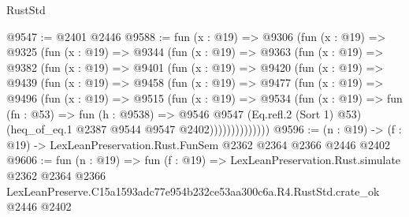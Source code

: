 \begin{lexlean}{RustStd}
\begin{coremodule}
@9547 := @2401 @2446
@9588 := fun (x : @19) =>
  @9306
    (fun (x : @19) =>
    @9325
      (fun (x : @19) =>
      @9344
        (fun (x : @19) =>
        @9363
          (fun (x : @19) =>
          @9382
            (fun (x : @19) =>
            @9401
              (fun (x : @19) =>
              @9420
                (fun (x : @19) =>
                @9439
                  (fun (x : @19) =>
                  @9458
                    (fun (x : @19) =>
                    @9477
                      (fun (x : @19) =>
                      @9496
                        (fun (x : @19) =>
                        @9515
                          (fun (x : @19) =>
                          @9534
                            (fun (x : @19) =>
                            fun (fn : @53) =>
                            fun (h : @9538) =>
                            @9546
                              @9547
                              (Eq.refl.{2} (Sort 1) @53)
                              (heq_of_eq.{1} @2387 @9544 @9547 @2402))))))))))))))
@9596 := (n : @19) -> (f : @19) -> LexLeanPreservation.Rust.FunSem @2362 @2364 @2366 @2446 @2402
@9606 := fun (n : @19) =>
  fun (f : @19) =>
  LexLeanPreservation.Rust.simulate
    @2362
    @2364
    @2366
    LexLeanPreserve.C15a1593adc77e954b232ce53aa300c6a.R4.RustStd.crate_ok
    @2446
    @2402
\end{coremodule}
\end{lexlean}
